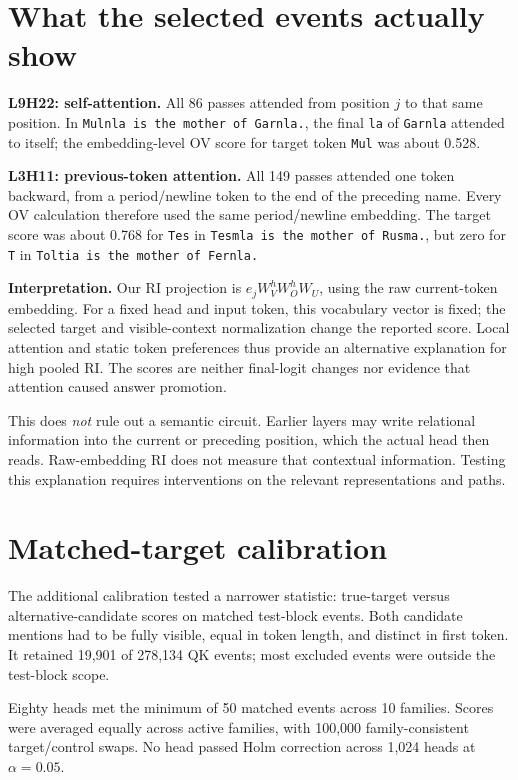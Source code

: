 \documentclass[11pt,a4paper]{article}
\begin{document}
\section{What the selected events actually show}
\textbf{L9H22: self-attention.} All 86 passes attended from position $j$ to that same position. In \texttt{Mulnla is the mother of Garnla.}, the final \texttt{la} of \texttt{Garnla} attended to itself; the embedding-level OV score for target token \texttt{Mul} was about 0.528.

\textbf{L3H11: previous-token attention.} All 149 passes attended one token backward, from a period/newline token to the end of the preceding name. Every OV calculation therefore used the same period/newline embedding. The target score was about 0.768 for \texttt{Tes} in \texttt{Tesmla is the mother of Rusma.}, but zero for \texttt{T} in \texttt{Toltia is the mother of Fernla.}

\textbf{Interpretation.} Our RI projection is $e_jW_V^hW_O^hW_U$, using the raw current-token embedding. For a fixed head and input token, this vocabulary vector is fixed; the selected target and visible-context normalization change the reported score. Local attention and static token preferences thus provide an alternative explanation for high pooled RI. The scores are neither final-logit changes nor evidence that attention caused answer promotion.

This does \emph{not} rule out a semantic circuit. Earlier layers may write relational information into the current or preceding position, which the actual head then reads. Raw-embedding RI does not measure that contextual information. Testing this explanation requires interventions on the relevant representations and paths.

\section{Matched-target calibration}
The additional calibration tested a narrower statistic: true-target versus alternative-candidate scores on matched test-block events. Both candidate mentions had to be fully visible, equal in token length, and distinct in first token. It retained 19,901 of 278,134 QK events; most excluded events were outside the test-block scope.

Eighty heads met the minimum of 50 matched events across 10 families. Scores were averaged equally across active families, with 100,000 family-consistent target/control swaps. No head passed Holm correction across 1,024 heads at $\alpha=0.05$.
\end{document}
